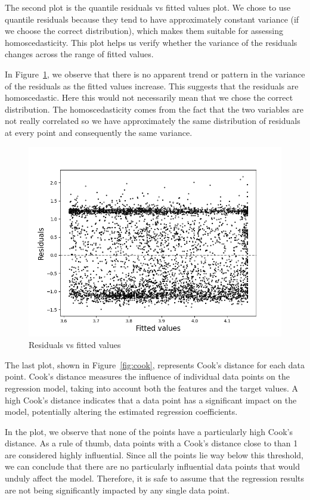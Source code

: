 \documentclass[9pt]{IEEEtran}
\begin{document}
The second plot is the quantile residuals vs fitted values plot. We chose to use quantile
 residuals because they tend to have approximately constant variance (if we choose the correct 
 distribution), which makes them suitable
  for assessing homoscedasticity. This plot
   helps us verify whether the variance of the residuals changes across the range of fitted values.

In Figure~\ref{fig:res_vs_fitted}, we observe that there is no apparent trend or pattern in the 
variance of the residuals as the fitted values increase. This suggests that the residuals are 
homoscedastic. Here this would not necessarily mean that we chose the correct distribution. 
The homoscedasticity comes from the fact that the two variables are not really correlated 
so we have approximately the same distribution of residuals at every point and consequently 
the same variance. 


\begin{figure}[h]
    \centering
    \includegraphics[width=0.9\columnwidth]{figures/res_vs_fitted.png}
    \caption{Residuals vs fitted values}
    \label{fig:res_vs_fitted}
\end{figure}

The last plot, shown in Figure~\ref{fig:cook}, represents Cook's distance for each data point.
 Cook's distance measures the influence of individual data points on the regression model,
  taking into account both the features and the target values. A high Cook's distance indicates
   that a data point has a significant impact on the model, potentially altering the estimated 
   regression coefficients.

In the plot, we observe that none of the points have a particularly high Cook's distance.
 As a rule of thumb, data points with a Cook's distance close to  than 1 are 
 considered highly influential. Since all the points lie way below this threshold, we can 
 conclude that there are no particularly influential data points that would unduly affect 
 the model. Therefore, it is safe to assume that the regression results are not being 
 significantly impacted by any single data point.
\end{document}
